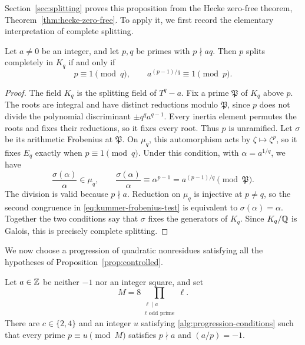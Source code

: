 Section~\ref{sec:splitting} proves this proposition from the Hecke
zero-free theorem, Theorem~\ref{thm:hecke-zero-free}. To apply it, we first record
the elementary interpretation of complete splitting.

\begin{lemma}\label{alg:splitting-test}
Let $a\ne0$ be an integer, and let $p,q$ be primes with $p\nmid aq$.
Then $p$ splits completely in $K_q$ if and only if
\begin{equation}
 p\equiv1\pmod q,\qquad a^{(p-1)/q}\equiv1\pmod p.
 \label{eq:kummer-frobenius-test}
\end{equation}
\end{lemma}

\begin{proof}
The field $K_q$ is the splitting field of $T^q-a$. Fix a prime
$\mathfrak P$ of $K_q$ above $p$. The roots are integral and have distinct
reductions modulo $\mathfrak P$, since $p$ does not divide the polynomial
discriminant $\pm q^q a^{q-1}$. Every inertia element permutes the roots
and fixes their reductions, so it fixes every root. Thus $p$ is
unramified. Let $\sigma$ be its arithmetic Frobenius at $\mathfrak P$.
On $\mu_q$, this automorphism acts by $\zeta\mapsto\zeta^p$, so it fixes
$E_q$ exactly when $p\equiv1\pmod q$. Under this condition, with
$\alpha=a^{1/q}$, we have
\[
 \frac{\sigma(\alpha)}{\alpha}\in\mu_q,
 \qquad
 \frac{\sigma(\alpha)}{\alpha}
 \equiv\alpha^{p-1}=a^{(p-1)/q}\pmod{\mathfrak P}.
\]
The division is valid because $p\nmid a$. Reduction on $\mu_q$ is
injective at $p\ne q$, so the second congruence in
\eqref{eq:kummer-frobenius-test} is equivalent to $\sigma(\alpha)=\alpha$.
Together the two conditions say that $\sigma$ fixes the generators of
$K_q$. Since $K_q/\mathbb{Q}$ is Galois, this is precisely complete splitting.
\end{proof}

We now choose a progression of quadratic nonresidues satisfying all
the hypotheses of Proposition~\ref{prop:controlled}.

\begin{lemma}
\label{alg:quadratic-progression}
Let $a\in\mathbb{Z}$ be neither $-1$ nor an integer square, and set
\[
 M=8\prod_{\substack{\ell\mid a\\\ell\text{ odd prime}}}\ell.
\]
There are $c\in\{2,4\}$ and an integer $u$ satisfying
\eqref{alg:progression-conditions} such that every prime $p\equiv u\pmod M$
satisfies $p\nmid a$ and $(a/p)=-1$.
\end{lemma}

